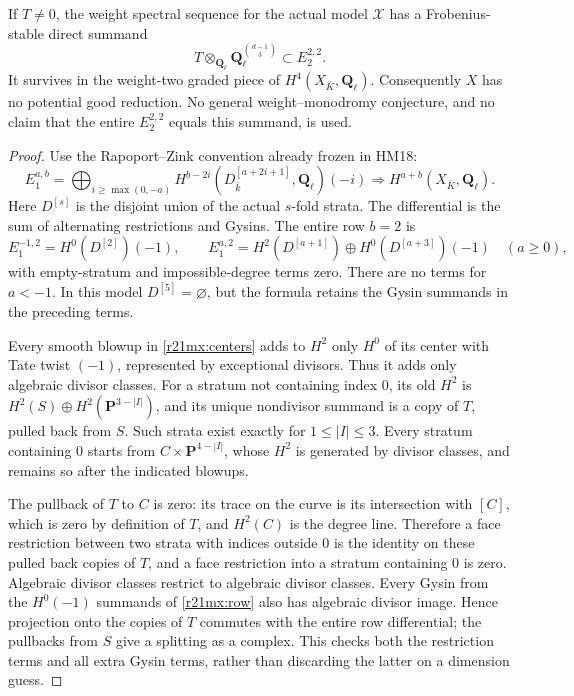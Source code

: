 \begin{theorem}
\label{r21mx:bad}
If $T\ne0$, the weight spectral sequence for the actual model
$\mathcal X$ has a Frobenius-stable direct summand
\[
      T\otimes_{\mathbf Q_\ell}\mathbf Q_\ell^{\binom{d-1}{3}}
                             \subset E_2^{2,2}.
 \tag{MX21.11}\label{r21mx:weight2}
\]
It survives in the weight-two graded piece of
$H^4(X_{\bar K},\mathbf Q_\ell)$.  Consequently $X$ has no potential
good reduction.  No general weight--monodromy conjecture, and no
claim that the entire $E_2^{2,2}$ equals this summand, is used.
\end{theorem}

\begin{proof}
Use the Rapoport--Zink convention already frozen in HM18:
\[
 E_1^{a,b}=\bigoplus_{i\ge\max(0,-a)}
 H^{b-2i}(D^{[a+2i+1]}_{\bar k},\mathbf Q_\ell)(-i)
       \Longrightarrow H^{a+b}(X_{\bar K},\mathbf Q_\ell).
 \tag{MX21.12}\label{r21mx:rz}
\]
Here $D^{[s]}$ is the disjoint union of the actual $s$-fold strata.
The differential is the sum of alternating restrictions and Gysins.
The entire row $b=2$ is
\[
 E_1^{-1,2}=H^0(D^{[2]})(-1),\qquad
 E_1^{a,2}=H^2(D^{[a+1]})\oplus H^0(D^{[a+3]})(-1)
                                      \quad(a\ge0),
 \tag{MX21.13}\label{r21mx:row}
\]
with empty-stratum and impossible-degree terms zero.  There are no
terms for $a<-1$.  In this model $D^{[5]}=\varnothing$, but the
formula retains the Gysin summands in the preceding terms.

Every smooth blowup in \eqref{r21mx:centers} adds to $H^2$ only
$H^0$ of its center with Tate twist $(-1)$, represented by exceptional
divisors.  Thus it adds only algebraic divisor classes.  For a stratum
not containing index $0$, its old $H^2$ is
$H^2(S)\oplus H^2(\mathbf P^{3-|I|})$, and its unique nondivisor
summand is a copy of $T$, pulled back from $S$.  Such strata exist
exactly for $1\le |I|\le3$.  Every stratum containing $0$ starts from
$C\times\mathbf P^{4-|I|}$, whose $H^2$ is generated by divisor
classes, and remains so after the indicated blowups.

The pullback of $T$ to $C$ is zero: its trace on the curve is its
intersection with $[C]$, which is zero by definition of $T$, and
$H^2(C)$ is the degree line.  Therefore a face restriction between
two strata with indices outside $0$ is the identity on these pulled
back copies of $T$, and a face restriction into a stratum containing
$0$ is zero.  Algebraic divisor classes restrict to algebraic
divisor classes.  Every Gysin from the $H^0(-1)$ summands of
\eqref{r21mx:row} also has algebraic divisor image.  Hence projection
onto the copies of $T$ commutes with the entire row differential;
the pullbacks from $S$ give a splitting as a complex.  This checks
both the restriction terms and all extra Gysin terms, rather than
discarding the latter on a dimension guess.


\end{proof}
